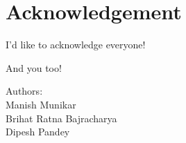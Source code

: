 \section*{Acknowledgement}

I'd like to acknowledge everyone!

And you too!

Authors:\\
Manish Munikar\\
Brihat Ratna Bajracharya\\
Dipesh Pandey
